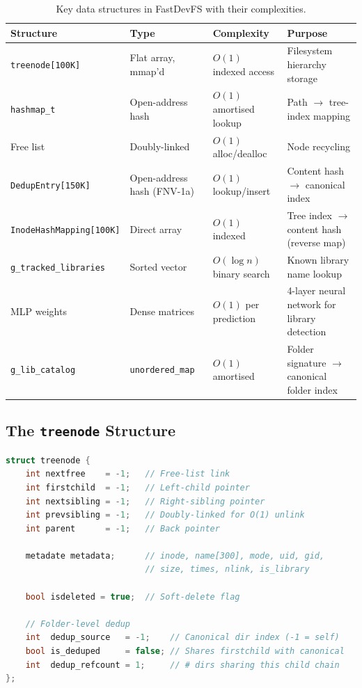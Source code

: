 \documentclass[12pt, a4paper]{article}
\begin{document}
\begin{table}[H]
\centering
\begin{tabular}{p{3cm}p{3cm}p{3cm}p{4cm}}
\toprule
\textbf{Structure} & \textbf{Type} & \textbf{Complexity} & \textbf{Purpose} \\
\midrule
\texttt{treenode[100K]} & Flat array, mmap'd & $O(1)$ indexed access & Filesystem hierarchy storage \\
\texttt{hashmap\_t} & Open-address hash & $O(1)$ amortised lookup & Path $\to$ tree-index mapping \\
Free list & Doubly-linked & $O(1)$ alloc/dealloc & Node recycling \\
\texttt{DedupEntry[150K]} & Open-address hash (FNV-1a) & $O(1)$ lookup/insert & Content hash $\to$ canonical index \\
\texttt{InodeHashMapping[100K]} & Direct array & $O(1)$ indexed & Tree index $\to$ content hash (reverse map) \\
\texttt{g\_tracked\_libraries} & Sorted vector & $O(\log n)$ binary search & Known library name lookup \\
MLP weights & Dense matrices & $O(1)$ per prediction & 4-layer neural network for library detection \\
\texttt{g\_lib\_catalog} & \texttt{unordered\_map} & $O(1)$ amortised & Folder signature $\to$ canonical folder index \\
\bottomrule
\end{tabular}
\caption{Key data structures in FastDevFS with their complexities.}
\end{table}

\subsection{The \texttt{treenode} Structure}

\begin{lstlisting}[language=C++, caption={The \texttt{treenode} POD structure (mmap-safe).}]
struct treenode {
    int nextfree    = -1;   // Free-list link
    int firstchild  = -1;   // Left-child pointer
    int nextsibling = -1;   // Right-sibling pointer
    int prevsibling = -1;   // Doubly-linked for O(1) unlink
    int parent      = -1;   // Back pointer

    metadate metadata;      // inode, name[300], mode, uid, gid,
                            // size, times, nlink, is_library

    bool isdeleted = true;  // Soft-delete flag

    // Folder-level dedup
    int  dedup_source   = -1;    // Canonical dir index (-1 = self)
    bool is_deduped     = false; // Shares firstchild with canonical
    int  dedup_refcount = 1;     // # dirs sharing this child chain
};
\end{lstlisting}
\end{document}
